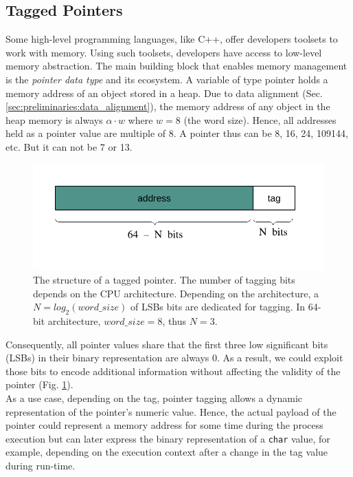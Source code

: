 \subsection{Tagged Pointers}
Some high-level programming languages, like C++, offer developers toolsets to work with memory. Using such toolsets, developers have access to low-level memory abstraction. The main building block that enables memory management is the \textit{pointer data type} and its ecosystem. A variable of type pointer holds a memory address of an object stored in a heap. Due to data alignment (Sec. \ref{sec:preliminaries:data_alignment}), the memory address of any object in the heap memory is always $\alpha\cdot w$ where $w=8$ (the word size). Hence, all addresses held as a pointer value are multiple of 8. A pointer thus can be 8, 16, 24, 109144, etc. But it can not be 7 or 13. \\

\begin{figure}
	\centering
	\includegraphics[scale=1]{figures/chapter2/pointervalue}
	\caption{The structure of a tagged pointer. The number of tagging bits depends on the CPU architecture. Depending on the architecture, a $ N = log_{2}(word\_size)$ of LSBs bits are dedicated for tagging. In 64-bit architecture, $word\_size = 8$, thus $N = 3$.}
	\label{fig:tagged_pointer}
\end{figure}

Consequently, all pointer values share that the first three low significant bits (LSBs) in their binary representation are always 0. As a result, we could exploit those bits to encode additional information without affecting the validity of the pointer (Fig. \ref{fig:tagged_pointer}).  \\

As a use case, depending on the tag, pointer tagging allows a dynamic representation of the pointer's numeric value. Hence, the actual payload of the pointer could represent a memory address for some time during the process execution but can later express the binary representation of a \texttt{char} value, for example, depending on the execution context after a change in the tag value during run-time. \\

